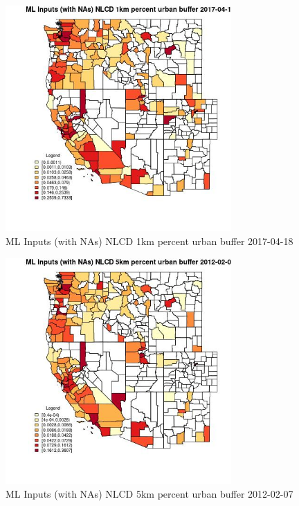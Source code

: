 \begin{figure} 
\centering  
\includegraphics[width=0.77\textwidth]{Code_Outputs/Report_ML_input_PM25_Step4_part_f_de_duplicated_aves_prioritize_24hr_obswNAs_CountyNLCD_1km_percent_urban_bufferMean2017-04-18.jpg} 
\caption{\label{fig:Report_ML_input_PM25_Step4_part_f_de_duplicated_aves_prioritize_24hr_obswNAsCountyNLCD_1km_percent_urban_bufferMean2017-04-18}ML Inputs (with NAs) NLCD 1km percent urban buffer 2017-04-18} 
\end{figure} 
 

\begin{figure} 
\centering  
\includegraphics[width=0.77\textwidth]{Code_Outputs/Report_ML_input_PM25_Step4_part_f_de_duplicated_aves_prioritize_24hr_obswNAs_CountyNLCD_5km_percent_urban_bufferMean2012-02-07.jpg} 
\caption{\label{fig:Report_ML_input_PM25_Step4_part_f_de_duplicated_aves_prioritize_24hr_obswNAsCountyNLCD_5km_percent_urban_bufferMean2012-02-07}ML Inputs (with NAs) NLCD 5km percent urban buffer 2012-02-07} 
\end{figure} 
 

